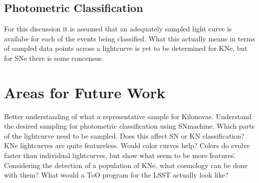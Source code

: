 \documentclass[12pt]{article}
\begin{document}
\subsection{Photometric Classification} %
For this discussion it is assumed that an adequately sampled light curve is availabe for each of the events being classified. What this actually means in terms of sampled data points across a lightcurve is yet to be determined for KNe, but for SNe there is some concensus.
\section{Areas for Future Work} %
Better understanding of what a representative sample for Kilonovae.
Understand the desired sampling for photometric classification using SNmachine. Which parts of the lightcurve need to be sampled. Does this affect SN or KN classification?
KNe lightcurves are quite featureless. Would color curves help? Colors do evolve faster than individual lightcurves, but show what seem to be more \"features\".
Considering the detection of a population of KNe, what cosmology can be done with them?
What would a ToO program for the LSST actually look like?

\newpage


\end{document}

